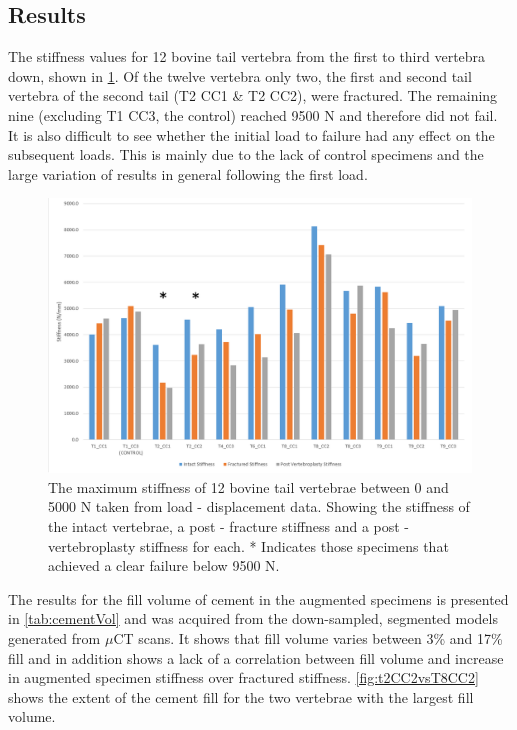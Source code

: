 \subsection{Results}\label{results}

The stiffness values for 12 bovine tail vertebra from the first to third vertebra down, shown in \cref{fig:allexpData}. Of the twelve vertebra only two, the first and second tail vertebra of the second tail (T2 CC1 \& T2 CC2), were fractured. The remaining nine (excluding T1 CC3, the control) reached 9500 N and therefore did not fail. It is also difficult to see whether the initial load to failure had any effect on the subsequent loads. This is mainly due to the lack of control specimens and the large variation of results in general following the first load.

\begin{figure}[ht!]
\centering
\includegraphics[width=\textwidth]{images/All_experimental_Data.png}
\caption{The maximum stiffness of 12 bovine tail vertebrae between 0 and 5000 N taken from load - displacement data. Showing the stiffness of the intact vertebrae, a post - fracture stiffness and a post - vertebroplasty stiffness for each. * Indicates those specimens that achieved a clear failure below 9500 N.}
\label{fig:allexpData}
\end{figure}

The results for the fill volume of cement in the augmented specimens is presented in \cref{tab:cementVol} and was acquired from the down-sampled, segmented models generated from $\mu$CT scans. It shows that fill volume varies between 3\% and 17\% fill and in addition shows a lack of a correlation between fill volume and increase in augmented specimen stiffness over fractured stiffness. \cref{fig:t2CC2vsT8CC2} shows the extent of the cement fill for the two vertebrae with the largest fill volume.

